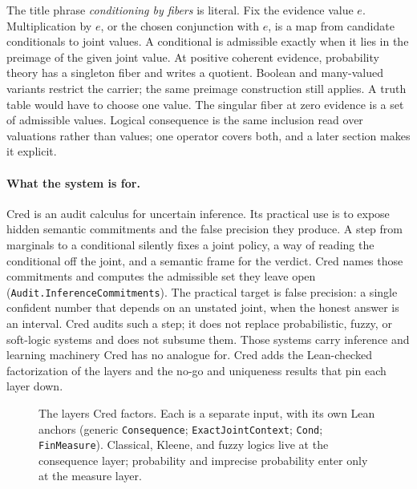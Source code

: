 \documentclass[11pt,a4paper]{article}
\newcommand{\cred}{\mathsf{cred}}
\newcommand{\Cond}{\mathsf{Cond}}
\newcommand{\negc}{\mathord{\sim}}
\newcommand{\conjc}{\otimes}
\newcommand{\disjc}{\sqcup}
\newcommand{\Lean}[1]{\texttt{#1}}
\begin{document}
The title phrase \emph{conditioning by fibers} is literal.  Fix the
evidence value $e$.  Multiplication by $e$, or the chosen conjunction
with $e$, is a map from candidate conditionals to joint values.  A
conditional is admissible exactly when it lies in the preimage of the
given joint value.  At positive coherent evidence, probability theory
has a singleton fiber and writes a quotient.  Boolean and many-valued
variants restrict the carrier; the same preimage construction still
applies.  A truth table would have to choose one value.  The singular
fiber at zero evidence is a set of admissible values.  Logical
consequence is the same inclusion read over valuations rather than
values; one operator covers both, and a later section makes it explicit.

\paragraph{What the system is for.}
Cred is an audit calculus for uncertain inference.  Its practical use is
to expose hidden semantic commitments and the false precision they
produce.  A step from marginals to a conditional silently fixes a joint
policy, a way of reading the conditional off the joint, and a semantic
frame for the verdict.  Cred names those commitments and computes the
admissible set they leave open (\Lean{Audit.InferenceCommitments}).  The
practical target is false precision: a single confident number that
depends on an unstated joint, when the honest answer is an interval.
Cred audits such a step; it does not replace probabilistic, fuzzy, or
soft-logic systems and does not subsume them.  Those systems carry
inference and learning machinery Cred has no analogue for.  Cred adds
the Lean-checked factorization of the layers and the no-go and
uniqueness results that pin each layer down.

\begin{figure}[h]
\centering
{}
\caption{The layers Cred factors.  Each is a separate input, with its own Lean
anchors (generic \texttt{Consequence}; \texttt{ExactJointContext}; \texttt{Cond};
\texttt{FinMeasure}).  Classical, Kleene, and fuzzy logics live at the consequence
layer; probability and imprecise probability enter only at the measure layer.}
\label{fig:layer-stack}
\end{figure}
\end{document}
